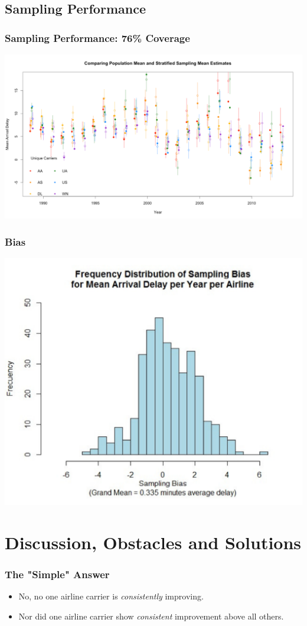 \documentclass{beamer}
\begin{document}
\subsection{Sampling Performance}
\begin{frame}
\frametitle{Sampling Performance: 76\% Coverage}
\begin{center} 
\includegraphics[width=1 \textwidth]{noLine}
\end{center}

\end{frame}

\begin{frame}
\frametitle{Bias}
\begin{center} 
\includegraphics[width=.7 \textwidth]{bias}
\end{center}

\end{frame}


\section{Discussion, Obstacles and Solutions}
\begin{frame}
\frametitle{The "Simple" Answer}
\begin{itemize}
\item No, no one airline carrier is \emph{consistently} improving.
\item Nor did one airline carrier show \emph{consistent} improvement above all others. 
\end{itemize}

\end{frame}
\end{document}
